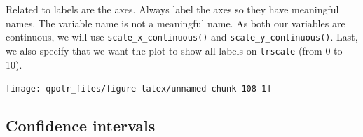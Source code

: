 \documentclass[12pt,oneside]{reedthesis}
\theoremstyle{definition}
\theoremstyle{definition}
\theoremstyle{definition}
\theoremstyle{remark}
\begin{document}
  Related to labels are the axes. Always label the axes so they have
  meaningful names. The variable name is not a meaningful name. As both
  our variables are continuous, we will use
  \texttt{scale\_x\_continuous()} and \texttt{scale\_y\_continuous()}.
  Last, we also specify that we want the plot to show all labels on
  \texttt{lrscale} (from 0 to 10).
  \begin{Shaded}
  \begin{Highlighting}[]
  \NormalTok{(}\OperatorTok{+}
  \StringTok{  }\NormalTok{(} \NormalTok{, }\NormalTok{) }\OperatorTok{+}\StringTok{ }
  \StringTok{  }\NormalTok{(}\NormalTok{, }\NormalTok{) }\OperatorTok{+}
  \StringTok{  }\NormalTok{(} \NormalTok{(}\NormalTok{, }\NormalTok{)) }\OperatorTok{+}
  \StringTok{  }\NormalTok{() }\OperatorTok{+}\StringTok{ }
  \StringTok{  }\NormalTok{(}
       \NormalTok{,}
       \NormalTok{,}
       
  \NormalTok{  ) }\OperatorTok{+}
  \StringTok{  }\NormalTok{(}\NormalTok{, }\OperatorTok{:}\NormalTok{, }\OperatorTok{:}\NormalTok{) }\OperatorTok{+}
  \StringTok{  }\NormalTok{(}\NormalTok{) }
  \end{Highlighting}
  \end{Shaded}
  \begin{center}\texttt{[image: qpolr\_files/figure-latex/unnamed-chunk-108-1]} \end{center}
  
  \subsection{Confidence intervals}\label{confidence-intervals}
  
\end{document}

